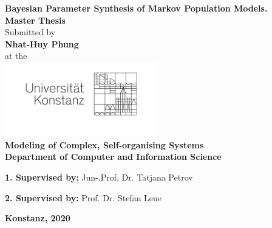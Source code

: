 \begin{titlepage}
  \begin{center}
    {\LARGE \textbf{Bayesian Parameter Synthesis of Markov Population Models.}}
    \\[1cm]
    {\Large \textbf{Master Thesis}}
    \\[1cm]
    {\Large Submitted by}
    \\[0.5cm]
    {\LARGE \textbf{Nhat-Huy Phung}}
    \\[0.5cm]
    {\Large at the}
    \\[0.5cm]
    \includegraphics[width=0.5\textwidth]{figures/unisignet-klein.jpg}
    \\[1cm]
    {\large \textbf{Modeling of Complex, Self-organising Systems}}
    \\[1cm]
    {\large \textbf{Department of Computer and Information Science}}
    \\[2cm]
    \begin{minipage}[c]{\textwidth}
      \begin{description}[style=multiline]
        \item {\large \textbf{1. Supervised by:} Jun-.Prof. Dr. Tatjana Petrov }
        \item {\large \textbf{2. Supervised by:} Prof. Dr. Stefan Leue }
      \end{description}
    \end{minipage}
    \vfill
    {\LARGE \textbf{Konstanz, 2020}}
  \end{center}
\end{titlepage}